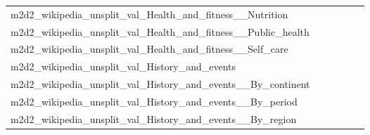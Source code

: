 {\begin{longtable}{m{6cm}m{1.7cm}m{1.7cm}m{1.7cm}m{1.7cm}m{1.7cm}}
	m2d2\_wikipedia\_unsplit\_val\_Health\_and\_fitness\_\_Nutrition  & \colorbox[HTML]{fdfede}{\makebox[\mywidth][c]{8.91}} & \colorbox[HTML]{f4fab6}{\makebox[\mywidth][c]{8.68}} & \colorbox[HTML]{ffffe5}{\makebox[\mywidth][c]{9.40}} & \colorbox[HTML]{def2a6}{\makebox[\mywidth][c]{8.61}} & \colorbox[HTML]{77c578}{\makebox[\mywidth][c]{8.47}}\\
	m2d2\_wikipedia\_unsplit\_val\_Health\_and\_fitness\_\_Public\_health  & \colorbox[HTML]{fefee2}{\makebox[\mywidth][c]{10.75}} & \colorbox[HTML]{edf8b2}{\makebox[\mywidth][c]{10.47}} & \colorbox[HTML]{ffffe5}{\makebox[\mywidth][c]{11.14}} & \colorbox[HTML]{bde395}{\makebox[\mywidth][c]{10.37}} & \colorbox[HTML]{77c578}{\makebox[\mywidth][c]{10.30}}\\
	m2d2\_wikipedia\_unsplit\_val\_Health\_and\_fitness\_\_Self\_care  & \colorbox[HTML]{fdfede}{\makebox[\mywidth][c]{12.91}} & \colorbox[HTML]{e3f4aa}{\makebox[\mywidth][c]{12.49}} & \colorbox[HTML]{ffffe5}{\makebox[\mywidth][c]{13.61}} & \colorbox[HTML]{ccea9c}{\makebox[\mywidth][c]{12.42}} & \colorbox[HTML]{77c578}{\makebox[\mywidth][c]{12.28}}\\
	m2d2\_wikipedia\_unsplit\_val\_History\_and\_events  & \colorbox[HTML]{fdfedb}{\makebox[\mywidth][c]{13.65}} & \colorbox[HTML]{ebf7b0}{\makebox[\mywidth][c]{13.29}} & \colorbox[HTML]{ffffe5}{\makebox[\mywidth][c]{14.48}} & \colorbox[HTML]{daf0a4}{\makebox[\mywidth][c]{13.20}} & \colorbox[HTML]{77c578}{\makebox[\mywidth][c]{13.00}}\\
	m2d2\_wikipedia\_unsplit\_val\_History\_and\_events\_\_By\_continent  & \colorbox[HTML]{fdfede}{\makebox[\mywidth][c]{11.77}} & \colorbox[HTML]{e5f4ab}{\makebox[\mywidth][c]{11.44}} & \colorbox[HTML]{ffffe5}{\makebox[\mywidth][c]{12.36}} & \colorbox[HTML]{c5e799}{\makebox[\mywidth][c]{11.36}} & \colorbox[HTML]{77c578}{\makebox[\mywidth][c]{11.26}}\\
	m2d2\_wikipedia\_unsplit\_val\_History\_and\_events\_\_By\_period  & \colorbox[HTML]{fdfedf}{\makebox[\mywidth][c]{12.78}} & \colorbox[HTML]{f2fab5}{\makebox[\mywidth][c]{12.41}} & \colorbox[HTML]{ffffe5}{\makebox[\mywidth][c]{13.46}} & \colorbox[HTML]{e9f6af}{\makebox[\mywidth][c]{12.37}} & \colorbox[HTML]{77c578}{\makebox[\mywidth][c]{12.12}}\\
	m2d2\_wikipedia\_unsplit\_val\_History\_and\_events\_\_By\_region  & \colorbox[HTML]{fefee3}{\makebox[\mywidth][c]{12.36}} & \colorbox[HTML]{ecf7b1}{\makebox[\mywidth][c]{11.88}} & \colorbox[HTML]{ffffe5}{\makebox[\mywidth][c]{12.87}} & \colorbox[HTML]{d7efa2}{\makebox[\mywidth][c]{11.79}} & \colorbox[HTML]{77c578}{\makebox[\mywidth][c]{11.64}}\\

\end{longtable}}
